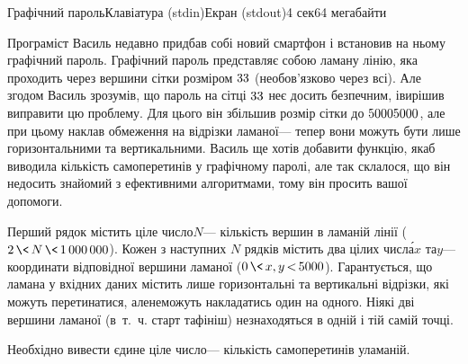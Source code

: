 \documentclass[14pt,a4paper]{extarticle}
\def\dib#1{\,#1\discretionary{}{\mbox{$#1$}}{}\,}
\begin{document}
\begin{problem}{Графічний пароль}{Клавіатура (stdin)}{Екран (stdout)}{4 сек}{64 мегабайти}


Програміст Василь недавно придбав собі новий смартфон і встановив на ньому графічний пароль. Графічний пароль представляє собою ламану лінію, яка проходить через вершини сітки розміром $3{\*}3$ (не\nolinebreak[3] обов'язково через всі). Але згодом Василь зрозумів, що пароль на сітці $3{\*}3$ не\nolinebreak[3] є досить безпечним, і\nolinebreak[3] вирішив виправити цю проблему. Для цього він збільшив розмір сітки до $5000{\*}5000$, але при цьому наклав обмеження на відрізки ламаної\nolinebreak[3] --- тепер вони можуть бути лише горизонтальними та вертикальними. Василь ще хотів добавити функцію, яка\nolinebreak[3] б виводила кількість самоперетинів у графічному паролі, але так склалося, що він не\nolinebreak[3] досить знайомий з ефективними алгоритмами, тому він просить вашої допомоги.

\InputFile
Перший рядок містить ціле число\nolinebreak[3] $N$\nolinebreak[3] --- кількість вершин в ламаній лінії ($2\dib{{\<}}N\dib{{\<}}{1\,000\,000}$). Кожен з наступних $N$ рядків містить два цілих числ\'{а}\nolinebreak[1] $x$ та\nolinebreak[3] $y$\nolinebreak[3] --- координати відповідної вершини ламаної ($0\dib{{\<}}{x, y}\dib{{<}}5000$). Гарантується, що ламана у вхідних даних містить лише горизонтальні та вертикальні відрізки, які можуть перетинатися, але\nolinebreak[1] не\nolinebreak[3] можуть накладатись один на одного. Ніякі дві вершини ламаної (в~т.~ч. старт та\nolinebreak[2] фініш) не\nolinebreak[3] знаходяться в одній і тій самій точці.

\OutputFile
Необхідно вивести єдине ціле число\nolinebreak[3] --- кількість самоперетинів у\nolinebreak[3] ламаній.

\Examples
\begin{exampleSimple}{5em}{3em}%
%
%
\end{exampleSimple}

\end{problem}
\end{document}
